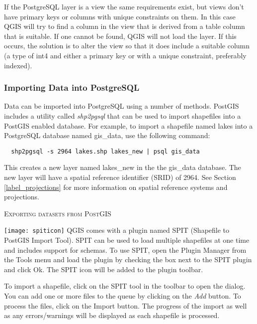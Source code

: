 If the PostgreSQL layer is a view the same requirements exist, but
views don't have primary keys or columns with unique constraints on
them. In this case QGIS will try to find a column in the view that is
derived from a table column that is suitable. If one cannot be found,
QGIS will not load the layer. If this occurs, the solution is to alter
the view so that it does include a suitable column (a type of int4
and either a primary key or with a unique constraint, preferably indexed).

\subsubsection{Importing Data into PostgreSQL}\label{sec:loading_postgis_data}

Data can be imported into PostgreSQL using a number of methods. PostGIS
includes a utility called \textsl{shp2pgsql} that can be used to import shapefiles into
a PostGIS enabled database. For example, to import a shapefile named lakes 
into a PostgreSQL database named gis\_data, use the following command:

\begin{verbatim} 
  shp2pgsql -s 2964 lakes.shp lakes_new | psql gis_data
\end{verbatim}

This creates a new layer named lakes\_new in the the gis\_data database. The
new layer will have a spatial reference identifier (SRID) of 2964. See Section 
\ref{label_projections} for more information on spatial reference systems and
projections.
\begin{Tip}
\caption{\textsc{Exporting datasets from PostGIS}}
\end{Tip}

\texttt{[image: spiticon]} QGIS comes with a
plugin named 
SPIT (Shapefile to PostGIS Import Tool).
SPIT can be used to load multiple shapefiles at one time and includes support
for schemas. To use SPIT, open the Plugin Manager from the Tools menu and load
the plugin by checking the box next to the SPIT plugin and click Ok. The SPIT
icon will be added to the plugin toolbar. 

To import a shapefile, click on the SPIT tool in the toolbar to open the
dialog.
You can add one or more files to the queue by clicking on the \textsl{Add}
button. To process the files, click on the Import button. The progress of the
import as well as any errors/warnings will be displayed as each shapefile is
processed.  

